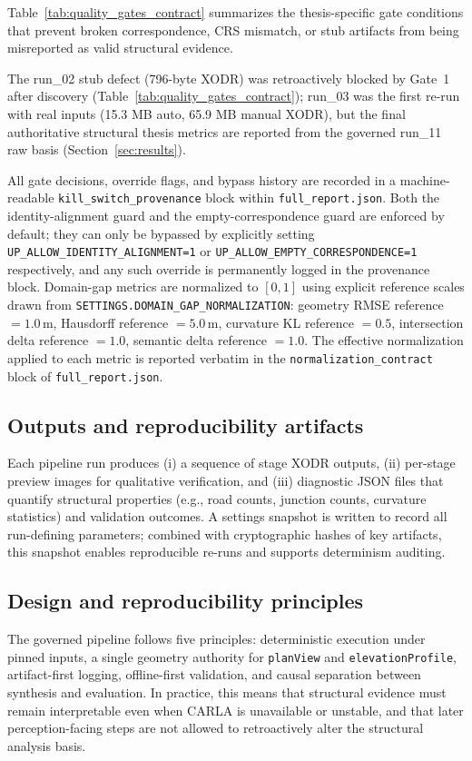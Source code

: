 Table~\ref{tab:quality_gates_contract} summarizes the thesis-specific gate conditions that prevent broken correspondence, CRS mismatch, or stub artifacts from being misreported as valid structural evidence.

The run\_02 stub defect (796-byte XODR) was retroactively blocked by Gate~1 after discovery (Table~\ref{tab:quality_gates_contract}); run\_03 was the first re-run with real inputs (15.3 MB auto, 65.9 MB manual XODR), but the final authoritative structural thesis metrics are reported from the governed run\_11 raw basis (Section~\ref{sec:results}).

All gate decisions, override flags, and bypass history are recorded in a machine-readable
\texttt{kill\_switch\_provenance} block within \texttt{full\_report.json}.
Both the identity-alignment guard and the empty-correspondence guard are enforced by default;
they can only be bypassed by explicitly setting \texttt{UP\_ALLOW\_}\allowbreak\texttt{IDENTITY\_ALIGNMENT=1}
or \texttt{UP\_ALLOW\_EMPTY\_}\allowbreak\texttt{CORRESPONDENCE=1} respectively, and any such override is
permanently logged in the provenance block.
Domain-gap metrics are normalized to $[0,1]$ using explicit reference scales drawn from
\texttt{SETTINGS.}\allowbreak\texttt{DOMAIN\_GAP\_}\allowbreak\texttt{NORMALIZATION}: geometry RMSE reference $= 1.0\,\text{m}$,
Hausdorff reference $= 5.0\,\text{m}$, curvature KL reference $= 0.5$,
intersection delta reference $= 1.0$, semantic delta reference $= 1.0$.
The effective normalization applied to each metric is reported verbatim in the
\texttt{normalization\_contract} block of \texttt{full\_report.json}.

\subsection{Outputs and reproducibility artifacts}
Each pipeline run produces (i) a sequence of stage XODR outputs, (ii) per-stage preview images for qualitative verification, and (iii) diagnostic JSON files that quantify structural properties (e.g., road counts, junction counts, curvature statistics) and validation outcomes. A settings snapshot is written to record all run-defining parameters; combined with cryptographic hashes of key artifacts, this snapshot enables reproducible re-runs and supports determinism auditing.




\subsection{Design and reproducibility principles}
The governed pipeline follows five principles: deterministic execution under pinned inputs, a single geometry authority for \texttt{planView} and \texttt{elevationProfile}, artifact-first logging, offline-first validation, and causal separation between synthesis and evaluation. In practice, this means that structural evidence must remain interpretable even when CARLA is unavailable or unstable, and that later perception-facing steps are not allowed to retroactively alter the structural analysis basis.

